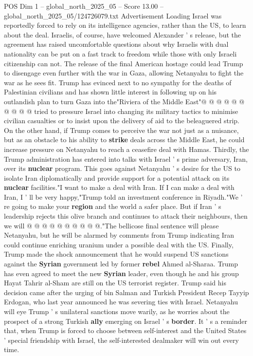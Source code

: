 \begin{textsample}{POS Dim 1 – global\_north\_2025\_05 – Score 13.00 – global\_north\_2025\_05/124726079.txt}
Advertisement Loading Israel was reportedly forced to rely on its intelligence agencies, rather than the US, to learn about the deal.
Israelis, of course, have welcomed Alexander ' s release, but the agreement has raised uncomfortable questions about why Israelis with dual nationality can be put on a fast track to freedom while those with only Israeli citizenship can not.
The release of the final American hostage could lead Trump to disengage even further with the war in Gaza, allowing Netanyahu to fight the war as he sees fit.
Trump has evinced next to no sympathy for the deaths of Palestinian civilians and has shown little interest in following up on his outlandish plan to turn Gaza into the"Riviera of the Middle East"@ @ @ @ @ @ @ @ @ @ tried to pressure Israel into changing its military tactics to minimise civilian casualties or to insist upon the delivery of aid to the beleaguered strip.
On the other hand, if Trump comes to perceive the war not just as a nuisance, but as an obstacle to his ability to \textbf{strike} deals across the Middle East, he could increase pressure on Netanyahu to reach a ceasefire deal with Hamas.
Thirdly, the Trump administration has entered into talks with Israel ' s prime adversary, Iran, over its \textbf{nuclear} program.
This goes against Netanyahu ' s desire for the US to isolate Iran diplomatically and provide support for a potential attack on its \textbf{nuclear} facilities."I want to make a deal with Iran.
If I can make a deal with Iran, I ' ll be very happy,"Trump told an investment conference in Riyadh."We ' re going to make your \textbf{region} and the world a safer place.
But if Iran ' s leadership rejects this olive branch and continues to attack their neighbours, then we will @ @ @ @ @ @ @ @ @ @."The bellicose final sentence will please Netanyahu, but he will be alarmed by comments from Trump indicating Iran could continue enriching uranium under a possible deal with the US.
Finally, Trump made the shock announcement that he would suspend US sanctions against the \textbf{Syrian} government led by former \textbf{rebel} Ahmed al-Sharaa.
Trump has even agreed to meet the new \textbf{Syrian} leader, even though he and his group Hayat Tahrir al-Sham are still on the US terrorist register.
Trump said his decision came after the urging of bin Salman and Turkish President Recep Tayyip Erdogan, who last year announced he was severing ties with Israel.
Netanyahu will eye Trump ' s unilateral sanctions move warily, as he worries about the prospect of a strong Turkish \textbf{ally} emerging on Israel ' s \textbf{border}.
It ' s a reminder that, when Trump is forced to choose between self-interest and the United States ' special friendship with Israel, the self-interested dealmaker will win out every time.

\end{textsample}
